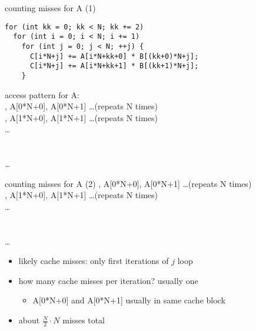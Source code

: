 
\begin{frame}[fragile,label=cacheBlockKLoadsA]{counting misses for A (1)}
\lstset{
    style=smaller,language=C,escapechar=@,
}
\begin{lstlisting}
for (int kk = 0; kk < N; kk += 2)
  for (int i = 0; i < N; i += 1)
    for (int j = 0; j < N; ++j) {
      C[i*N+j] += A[i*N+kk+0] * B[(kk+0)*N+j];
      C[i*N+j] += A[i*N+kk+1] * B[(kk+1)*N+j];
    }
\end{lstlisting}
access pattern for A: \\
, A[0*N+0], A[0*N+1] \ldots (repeats N times) \\
, A[1*N+0], A[1*N+1] \ldots (repeats N times) \\
\ldots \\
~\\
~\\
\ldots 
\end{frame}

\begin{frame}[fragile,label=cacheBlockKLoadsA2]{counting misses for A (2)}
, A[0*N+0], A[0*N+1] \ldots (repeats N times) \\
, A[1*N+0], A[1*N+1] \ldots (repeats N times) \\
\ldots \\
~\\
~\\
\ldots 
\begin{itemize}
\item<2-> likely cache misses: only first iterations of $j$ loop
\item<2-> how many cache misses per iteration? usually one
    \begin{itemize}
    \item A[0*N+0] and A[0*N+1] usually in same cache block
    \end{itemize}
\item<3-> about $\frac{N}{2}\cdot N$ misses total
\end{itemize}
\end{frame}

